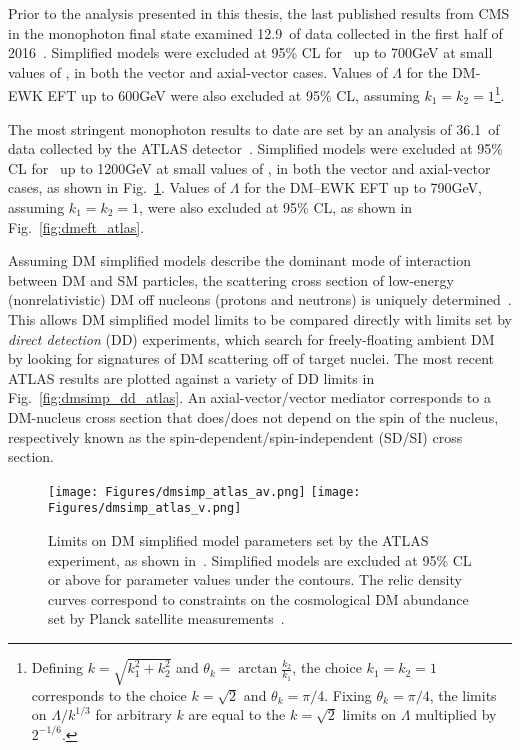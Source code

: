 Prior to the analysis presented in this thesis, the last published results from CMS in the monophoton final state examined 12.9\fbinv\ of data collected in the first half
of 2016~\cite{ref:JHEP10(2017)073}. Simplified models were excluded at 95\% CL for \mmed\ up to 700\unit{GeV} at small values of \mdm, in both the vector
and axial-vector cases. Values of $\Lambda$ for the DM-EWK EFT up to 600\unit{GeV} were also excluded at 95\% CL, assuming $k_{1} = k_{2} = 1$\footnote{Defining $k = \sqrt{k_{1}^{2} + k_{2}^{2}}$
and $\theta_{k} = \arctan{\frac{k_{2}}{k_{1}}}$, the choice $k_{1} = k_{2} = 1$ corresponds to the choice $k = \sqrt{2}$ and $\theta_{k} = \pi/4$. Fixing $\theta_{k} = \pi/4$,
the limits on $\Lambda / k^{1/3}$ for arbitrary $k$ are equal to the $k = \sqrt{2}$ limits on $\Lambda$ multiplied by $2^{-1/6}$.}.

The most stringent monophoton results to date are set by an analysis of 36.1\fbinv\ of data collected by the ATLAS detector~\cite{ref:epjc/s10052-017-4965-8}.
Simplified models were excluded at 95\% CL for \mmed\ up to 1200\unit{GeV} at small values of \mdm, in both the vector and axial-vector cases, as shown in Fig.~\ref{fig:dmsimp_atlas}.
Values of $\Lambda$ for the DM--EWK EFT up to 790\unit{GeV}, assuming $k_{1} = k_{2} = 1$, were also excluded at 95\% CL, as shown in Fig.~\ref{fig:dmeft_atlas}.

Assuming DM simplified models describe the dominant mode of interaction between DM and SM particles, the scattering cross section of low-energy (nonrelativistic) DM off nucleons (protons and neutrons)
is uniquely determined~\cite{ref:1603.04156}. This allows DM simplified model limits to be compared directly with limits set by \textit{direct detection} (DD) experiments, which search for freely-floating
ambient DM by looking for signatures of DM scattering off of target nuclei.
The most recent ATLAS results are plotted against a variety of DD limits in Fig.~\ref{fig:dmsimp_dd_atlas}. An axial-vector/vector mediator corresponds to a DM-nucleus cross section
that does/does not depend on the spin of the nucleus, respectively known as the spin-dependent/spin-independent (SD/SI) cross section.

\begin{figure}[hbtb]
  \begin{center}
    \texttt{[image: Figures/dmsimp\_atlas\_av.png]}
    \texttt{[image: Figures/dmsimp\_atlas\_v.png]}
    \caption{Limits on DM simplified model parameters set by the ATLAS experiment, as shown in~\cite{ref:epjc/s10052-017-4965-8}. Simplified models are excluded at 95\% CL or above
    for parameter values under the contours. The relic density curves correspond to constraints on the cosmological DM abundance set by Planck satellite measurements~\cite{ref:planck2018_cosparams}.
    }
    \label{fig:dmsimp_atlas}
  \end{center}
\end{figure}

